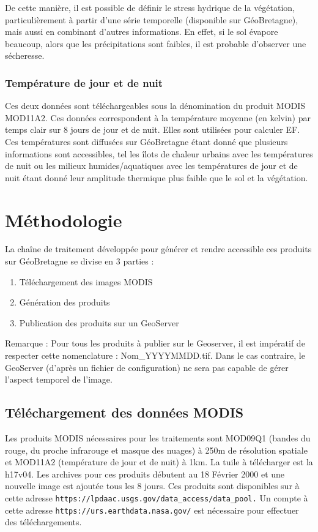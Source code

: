 \documentclass[10pt,a4paper]{article}
\begin{document}
De cette manière, il est possible de définir le stress hydrique de la végétation, particulièrement à partir d'une série temporelle (disponible sur GéoBretagne), mais aussi en combinant d'autres informations. En effet, si le sol évapore beaucoup, alors que les précipitations sont faibles, il est probable d'observer une sécheresse.

\subsubsection{Température de jour et de nuit}

Ces deux données sont téléchargeables sous la dénomination du produit MODIS MOD11A2. Ces données correspondent à la température moyenne (en kelvin) par temps clair sur 8 jours de jour et de nuit. Elles sont utilisées pour calculer EF. Ces températures sont diffusées sur GéoBretagne étant donné que plusieurs informations sont accessibles, tel les îlots de chaleur urbains avec les températures de nuit ou les milieux humides/aquatiques avec les températures de jour et de nuit étant donné leur amplitude thermique plus faible que le sol et la végétation.

\section{Méthodologie}

La chaîne de traitement développée pour générer et rendre accessible ces produits sur GéoBretagne se divise en 3 parties :

\begin{enumerate}
\item Téléchargement des images MODIS
\item Génération des produits
\item Publication des produits sur un GeoServer
\end{enumerate}

Remarque : Pour tous les produits à publier sur le Geoserver, il est impératif de respecter cette nomenclature : Nom\_YYYYMMDD.tif. Dans le cas contraire, le GeoServer (d'après un fichier de configuration) ne sera pas capable de gérer l'aspect temporel de l'image.

\subsection{Téléchargement des données MODIS}

Les produits MODIS nécessaires pour les traitements sont MOD09Q1 (bandes du rouge, du proche infrarouge et masque des nuages) à 250m de résolution spatiale et MOD11A2 (température de jour et de nuit) à 1km. La tuile à télécharger est la h17v04. Les archives pour ces produits débutent au 18 Février 2000 et une nouvelle image est ajoutée tous les 8 jours. Ces produits sont disponibles sur à cette adresse \verb!https://lpdaac.usgs.gov/data_access/data_pool.! Un compte à cette adresse \verb!https://urs.earthdata.nasa.gov/! est nécessaire pour effectuer des téléchargements. \smallbreak
\end{document}
